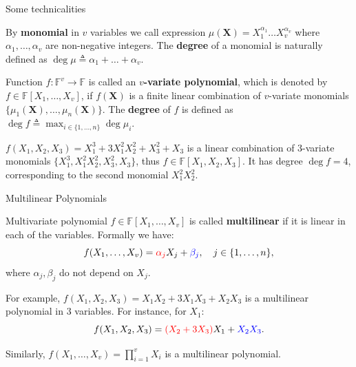 \documentclass{zkdl-presentation-template}
\begin{document}
    \begin{frame}{Some technicalities}
        \begin{definition}[Monomial]
            By \textbf{monomial} in $v$ variables we call expression
            $\mu(\mathbf{X})=X_1^{\alpha_1}\dots X_v^{\alpha_v}$ where
            $\alpha_1,\dots,\alpha_v$ are non-negative integers. The
            \textbf{degree} of a monomial is naturally defined as $\deg \mu \triangleq
            \alpha_1+\dots+\alpha_v$.\pause
        \end{definition}

        \begin{definition}
            Function $f: \mathbb{F}^v \to \mathbb{F}$ is called an
            \textbf{$v$-variate polynomial}, which is denoted by $f \in
            \mathbb{F}[X_1,\dots,X_v]$, if $f(\mathbf{X})$ is a finite linear
            combination of $v$-variate monomials
            $\{\mu_1(\mathbf{X}),\dots,\mu_n(\mathbf{X})\}$. The \textbf{degree}
            of $f$ is defined as $\deg f \triangleq \max_{i \in \{1,\dots,n\}}
            \deg \mu_i$.\pause
        \end{definition}

        \begin{example}
            $f(X_1,X_2,X_3)=X_1^3 + 3X_1^2X_2^2 + X_3^2 + X_3$ is a linear
            combination of 3-variate monomials $\{X_1^3, X_1^2X_2^2, X_3^2,
            X_3\}$, thus $f \in \mathbb{F}[X_1,X_2,X_3]$. It has degree $\deg
            f=4$, corresponding to the second monomial $X_1^2X_2^2$.
        \end{example}
    \end{frame}

    \begin{frame}{Multilinear Polynomials}
        \begin{definition}
            Multivariate polynomial $f \in \mathbb{F}[X_1,\dots,X_v]$ is called
            \textbf{multilinear} if it is linear in each of the variables.\pause
            Formally we have:
            \begin{equation*}
                f(X_1,\dots,X_v) = \textcolor{red}{\alpha_j} X_j + \textcolor{blue}{\beta_j}, \quad j \in \{1,\dots,n\},
            \end{equation*}
            where $\alpha_j,\beta_j$ do not depend on $X_j$.\pause
        \end{definition}

        \begin{example}
            For example, $f(X_1,X_2,X_3) = X_1X_2 + 3X_1X_3 + X_2X_3$ is a multilinear 
            polynomial in $3$ variables. For instance, for $X_1$:
            \begin{equation*}
                f(X_1,X_2,X_3) = \textcolor{red}{(X_2+3X_3)}X_1 + \textcolor{blue}{X_2X_3}.
            \end{equation*}

            \pause Similarly, $f(X_1,\dots,X_v)=\prod_{i=1}^v X_i$ is a multilinear
            polynomial.
        \end{example}
    \end{frame}
\end{document}
